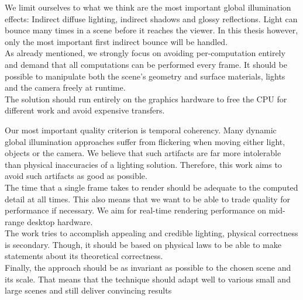 \documentclass[thesis.tex]{subfiles}
\begin{document}
We limit ourselves to what we think are the most important global illumination effects: Indirect diffuse lighting, indirect shadows and glossy reflections.
Light can bounce many times in a scene before it reaches the viewer.
In this thesis however, only the most important first indirect bounce will be handled.
\\
As already mentioned, we strongly focus on avoiding per-computation entirely and demand that all computations can be performed every frame.
It should be possible to manipulate both the scene's geometry and surface materials, lights and the camera freely at runtime.
\\
The solution should run entirely on the graphics hardware to free the CPU for different work and avoid expensive transfers.

Our most important quality criterion is temporal coherency.
Many dynamic global illumination approaches suffer from flickering when moving either light, objects or the camera.
We believe that such artifacts are far more intolerable than physical inaccuracies of a lighting solution.
Therefore, this work aims to avoid such artifacts as good as possible.
\\
The time that a single frame takes to render should be adequate to the computed detail at all times.
This also means that we want to be able to trade quality for performance if necessary.
We aim for real-time rendering performance on mid-range desktop hardware.
\\
The work tries to accomplish appealing and credible lighting, physical correctness is secondary.
Though, it should be based on physical laws to be able to make statements about its theoretical correctness.
\\
Finally, the approach should be as invariant as possible to the chosen scene and its scale.
That means that the technique should adapt well to various small and large scenes and still deliver convincing results



\end{document}
